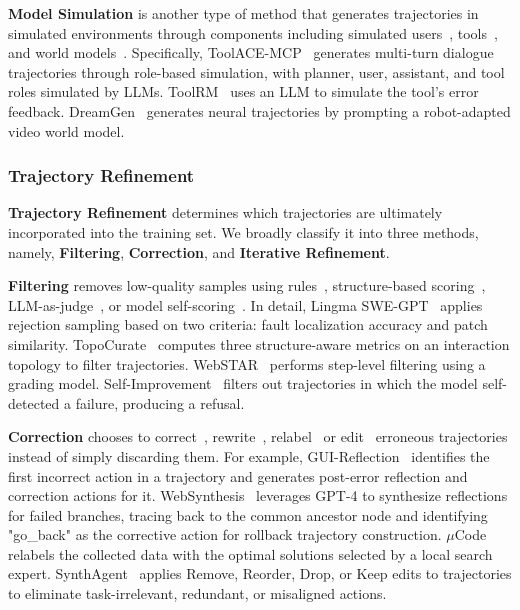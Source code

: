 \textbf{Model Simulation} is another type of method that generates trajectories in simulated environments through components including simulated users~\cite{APIGen-MT, AgentScaler,ToolACE-MCP}, tools~\cite{ToolAlpaca,ToolACE,ToolRM,MagicAgent}, and world models~\cite{DreamGen, WebSynthesis}. Specifically, ToolACE-MCP~\cite{ToolACE-MCP} generates multi-turn dialogue trajectories through role-based simulation, with planner, user, assistant, and tool roles simulated by LLMs. ToolRM~\cite{ToolRM} uses an LLM to simulate the tool’s error feedback. DreamGen~\cite{DreamGen} generates neural trajectories by prompting a robot-adapted video world model. 

\subsubsection{Trajectory Refinement}
\label{sec:trajectory_refinement}
\textbf{Trajectory Refinement} determines which trajectories are ultimately incorporated into the training set. We broadly classify it into three methods, namely, \textbf{Filtering}, \textbf{Correction}, and \textbf{Iterative Refinement}.


\textbf{Filtering} removes low-quality samples using rules~\cite{Toolformer,Lingma_SWE-GPT,SimpleDeepSearcher, WebResearcher, WebLeaper}, structure-based scoring~\cite{TopoCurate}, LLM-as-judge~\cite{OS-Genesis, Insta, MaskSearch, WebSTAR, Agent-Reward, AutoPlay}, or model self-scoring~\cite{Self-Improvement}. In detail, Lingma SWE-GPT~\cite{Lingma_SWE-GPT} applies rejection sampling based on two criteria: fault localization accuracy and patch similarity. TopoCurate~\cite{TopoCurate} computes three structure-aware metrics on an interaction topology to filter trajectories.  WebSTAR~\cite{WebSTAR} performs step-level filtering using a grading model. Self-Improvement~\cite{Self-Improvement} filters out trajectories in which the model self-detected a failure, producing a refusal.

\textbf{Correction} chooses to correct~\cite{GUI-Reflection,AgentFounder}, rewrite~\cite{ToolRM,UI-Venus-1.5,HATS}, relabel~\cite{muCode} or edit~\cite{SynthAgent} erroneous trajectories instead of simply discarding them. 
For example, GUI-Reflection~\cite{GUI-Reflection} identifies the first incorrect action in a trajectory and generates post-error reflection and correction actions for it. WebSynthesis~\cite{WebSynthesis} leverages GPT-4 to synthesize reflections for failed branches, tracing back to the common ancestor node and identifying "go\_back" as the corrective action for rollback trajectory construction. $\mu$Code~\cite{muCode} relabels the collected data with the optimal solutions selected by a local search expert. SynthAgent~\cite{SynthAgent} applies Remove, Reorder, Drop, or Keep edits to trajectories to eliminate task-irrelevant, redundant, or misaligned actions.



